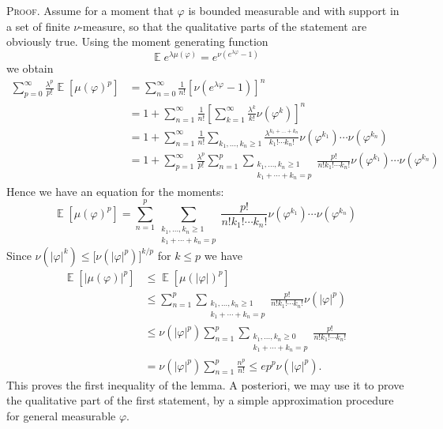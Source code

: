 \documentclass[a4paper,12pt]{article}
\DeclareMathOperator{\expect}{{\mathbb E}}
\begin{document}
\textsc{Proof. }Assume for a moment that $\varphi$ is bounded measurable and
with support in a set of finite $\nu$-measure, so that the qualitative parts
of the statement are obviously true. Using the moment generating function
\[
\expect e^{\lambda\mu(\varphi)}=e^{\nu(e^{\lambda\varphi}-1)}%
\]
we obtain
\[%
\begin{split}
\sum_{p=0}^{\infty}\frac{\lambda^{p}}{p!}\expect[ \mu(\varphi)^p ]  &
=\sum_{n=0}^{\infty}\frac{1}{n!}\left[  \nu(e^{\lambda\varphi}-1)\right]
^{n}\\
&  =1+\sum_{n=1}^{\infty}\frac{1}{n!}\left[  \sum_{k=1}^{\infty}\frac
{\lambda^{k}}{k!}\nu(\varphi^{k})\right]  ^{n}\\
&  =1+\sum_{n=1}^{\infty}\frac{1}{n!}\sum_{k_{1},\dots,k_{n}\geq1}%
\frac{\lambda^{k_{1}+\dots+k_{n}}}{k_{1}!\cdots k_{n}!}\nu(\varphi^{k_{1}%
})\cdots\nu(\varphi^{k_{n}})\\
&  =1+\sum_{p=1}^{\infty}\frac{\lambda^{p}}{p!}\sum_{n=1}^{p}\sum
_{\substack{k_{1},\dots,k_{n}\geq1 \\k_{1}+\cdots+k_{n}=p}}\frac{p!}%
{n!k_{1}!\cdots k_{n}!}\nu(\varphi^{k_{1}})\cdots\nu(\varphi^{k_{n}})
\end{split}
\]
Hence we have an equation for the moments:
\begin{equation}
\expect[ \mu(\varphi)^p ]=\sum_{n=1}^{p}\sum_{\substack{k_{1},\dots,k_{n}\geq1
\\k_{1}+\cdots+k_{n}=p}}\frac{p!}{n!k_{1}!\cdots k_{n}!}\nu(\varphi^{k_{1}%
})\cdots\nu(\varphi^{k_{n}}) \label{sum}%
\end{equation}
Since $\nu(|\varphi|^{k})\leq\lbrack\nu(|\varphi|^{p})]^{k/p}$ for $k\leq p$
we have
\[%
\begin{split}
\expect[|\mu(\varphi)|^p]  &  \leq\expect[ \mu(|\varphi|)^p ]\\
&  \leq\sum_{n=1}^{p}\sum_{\substack{k_{1},\dots,k_{n}\geq1 \\k_{1}%
+\cdots+k_{n}=p}}\frac{p!}{n!k_{1}!\cdots k_{n}!}\nu(|\varphi|^{p})\\
&  \leq\nu(|\varphi|^{p})\sum_{n=1}^{p}\sum_{\substack{k_{1},\dots,k_{n}\geq0
\\k_{1}+\cdots+k_{n}=p}}\frac{p!}{n!k_{1}!\cdots k_{n}!}\\
&  =\nu(|\varphi|^{p})\sum_{n=1}^{p}\frac{n^{p}}{n!}\leq ep^{p}\nu
(|\varphi|^{p}).
\end{split}
\]
This proves the first inequality of the lemma. A posteriori, we may use it to
prove the qualitative part of the first statement, by a simple approximation
procedure for general measurable $\varphi$.
\end{document}
